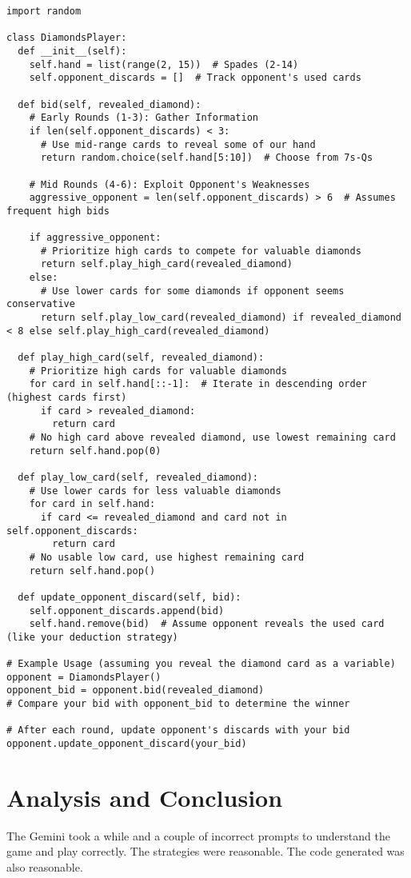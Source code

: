 \documentclass[a4paper,11pt,AutoFakeBold]{ctexart}
\begin{document}
\begin{lstlisting}[style=mystyle]
import random

class DiamondsPlayer:
  def __init__(self):
    self.hand = list(range(2, 15))  # Spades (2-14)
    self.opponent_discards = []  # Track opponent's used cards

  def bid(self, revealed_diamond):
    # Early Rounds (1-3): Gather Information
    if len(self.opponent_discards) < 3:
      # Use mid-range cards to reveal some of our hand
      return random.choice(self.hand[5:10])  # Choose from 7s-Qs

    # Mid Rounds (4-6): Exploit Opponent's Weaknesses
    aggressive_opponent = len(self.opponent_discards) > 6  # Assumes frequent high bids

    if aggressive_opponent:
      # Prioritize high cards to compete for valuable diamonds
      return self.play_high_card(revealed_diamond)
    else:
      # Use lower cards for some diamonds if opponent seems conservative
      return self.play_low_card(revealed_diamond) if revealed_diamond < 8 else self.play_high_card(revealed_diamond)

  def play_high_card(self, revealed_diamond):
    # Prioritize high cards for valuable diamonds
    for card in self.hand[::-1]:  # Iterate in descending order (highest cards first)
      if card > revealed_diamond:
        return card
    # No high card above revealed diamond, use lowest remaining card
    return self.hand.pop(0)

  def play_low_card(self, revealed_diamond):
    # Use lower cards for less valuable diamonds
    for card in self.hand:
      if card <= revealed_diamond and card not in self.opponent_discards:
        return card
    # No usable low card, use highest remaining card
    return self.hand.pop()

  def update_opponent_discard(self, bid):
    self.opponent_discards.append(bid)
    self.hand.remove(bid)  # Assume opponent reveals the used card (like your deduction strategy)

# Example Usage (assuming you reveal the diamond card as a variable)
opponent = DiamondsPlayer()
opponent_bid = opponent.bid(revealed_diamond)
# Compare your bid with opponent_bid to determine the winner

# After each round, update opponent's discards with your bid
opponent.update_opponent_discard(your_bid)

\end{lstlisting}
\section{Analysis and Conclusion}
The Gemini took a while and a couple of incorrect prompts to understand the game and play correctly. The strategies were reasonable. The code generated was also reasonable. 
\end{document}
